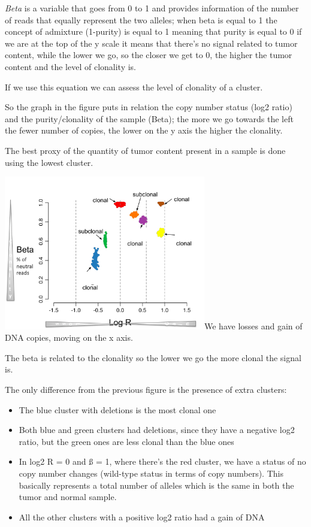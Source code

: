 \emph{{Beta}} is a variable that goes from 0 to 1 and provides information of
the number of reads that equally represent the two alleles; when beta is equal
to 1 the concept of admixture (1-purity) is equal to 1 meaning that purity is
equal to 0 if we are at the top of the y scale it means that there's no signal
related to tumor content, while the lower we go, so the closer we get to 0, the
higher the tumor content and the level of clonality is.

If we use this equation we can assess the level of clonality of a cluster.

So the graph in the figure puts in relation the copy number status (log2 ratio)
and the purity/clonality of the sample (Beta); the more we go towards the left
the fewer number of copies, the lower on the y axis the higher the clonality.

The best proxy of the quantity of tumor content present in a sample is done
using the lowest cluster.

\includegraphics[width=3.46875in,height=2.65139in]{image2.png}We have losses and
gain of DNA copies, moving on the x axis.

The beta is related to the clonality so the lower we go the more clonal the
signal is.

The only difference from the previous figure is the presence of extra clusters:

\begin{itemize}
\item
  The blue cluster with deletions is the most clonal one
\item
  Both blue and green clusters had deletions, since they have a negative log2
  ratio, but the green ones are less clonal than the blue ones
\item
  In log2 R = 0 and ß = 1, where there's the red cluster, we have a status of no
  copy number changes (wild-type status in terms of copy numbers). This
  basically represents a total number of alleles which is the same in both the
  tumor and normal sample.
\item
  All the other clusters with a positive log2 ratio had a gain of DNA
\end{itemize}

